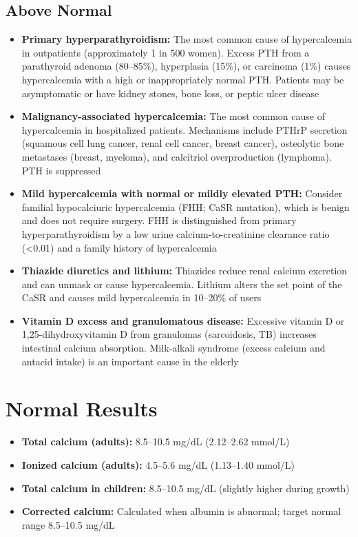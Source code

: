 \subsection*{Above Normal}
\begin{itemize}
  \item \textbf{Primary hyperparathyroidism:} The most common cause of hypercalcemia in outpatients (approximately 1 in 500 women). Excess PTH from a parathyroid adenoma (80--85\%), hyperplasia (15\%), or carcinoma (1\%) causes hypercalcemia with a high or inappropriately normal PTH. Patients may be asymptomatic or have kidney stones, bone loss, or peptic ulcer disease
  \item \textbf{Malignancy-associated hypercalcemia:} The most common cause of hypercalcemia in hospitalized patients. Mechanisms include PTHrP secretion (squamous cell lung cancer, renal cell cancer, breast cancer), osteolytic bone metastases (breast, myeloma), and calcitriol overproduction (lymphoma). PTH is suppressed
  \item \textbf{Mild hypercalcemia with normal or mildly elevated PTH:} Consider familial hypocalciuric hypercalcemia (FHH; CaSR mutation), which is benign and does not require surgery. FHH is distinguished from primary hyperparathyroidism by a low urine calcium-to-creatinine clearance ratio (<0.01) and a family history of hypercalcemia
  \item \textbf{Thiazide diuretics and lithium:} Thiazides reduce renal calcium excretion and can unmask or cause hypercalcemia. Lithium alters the set point of the CaSR and causes mild hypercalcemia in 10--20\% of users
  \item \textbf{Vitamin D excess and granulomatous disease:} Excessive vitamin D or 1,25-dihydroxyvitamin D from granulomas (sarcoidosis, TB) increases intestinal calcium absorption. Milk-alkali syndrome (excess calcium and antacid intake) is an important cause in the elderly
\end{itemize}

\section*{Normal Results}
\begin{itemize}
  \item \textbf{Total calcium (adults):} 8.5--10.5 mg/dL (2.12--2.62 mmol/L)
  \item \textbf{Ionized calcium (adults):} 4.5--5.6 mg/dL (1.13--1.40 mmol/L)
  \item \textbf{Total calcium in children:} 8.5--10.5 mg/dL (slightly higher during growth)
  \item \textbf{Corrected calcium:} Calculated when albumin is abnormal; target normal range 8.5--10.5 mg/dL
\end{itemize}

